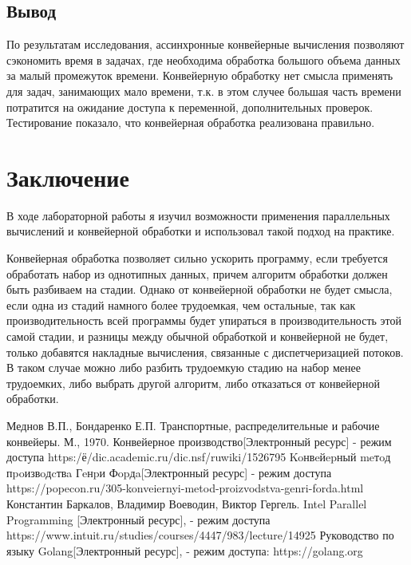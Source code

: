 \documentclass[12pt]{report}
\begin{document}
\section{Вывод}
По результатам исследования, ассинхронные конвейерные вычисления позволяют сэкономить время в задачах, где необходима обработка большого объема данных за малый промежуток времени. Конвейерную обработку нет смысла применять для задач, занимающих мало времени, т.к. в этом случее большая часть времени
потратится на ожидание доступа к переменной, дополнительных проверок.
Тестирование показало, что конвейерная обработка реализована правильно.

\chapter*{Заключение}
В ходе лабораторной работы я изучил возможности применения параллельных вычислений и конвейерной обработки и использовал такой подход на практике. 

Конвейерная обработка позволяет сильно ускорить программу, если требуется обработать набор из однотипных данных, причем алгоритм обработки должен быть разбиваем на стадии. Однако от конвейерной обработки не будет смысла, если одна из стадий намного более трудоемкая, чем остальные, так как производительность всей программы будет упираться в производительность этой самой стадии, и разницы между обычной обработкой и конвейерной не будет, только добавятся накладные вычисления, связанные с диспетчеризацией потоков. В таком случае можно либо разбить трудоемкую стадию на набор менее трудоемких, либо выбрать другой алгоритм, либо отказаться от конвейерной обработки.

 \begin{thebibliography}{3}
 Меднов В.П., Бондаренко Е.П. Транспортные, распределительные и рабочие конвейеры. М., 1970.
 Конвейерное производство[Электронный ресурс] - режим доступа https:/ё/dic.academic.ru/dic.nsf/ruwiki/1526795
 Koнвeйepный meтoд пpoизвoдcтвa Гeнpи Фopдa[Электронный ресурс] - режим доступа https://popecon.ru/305-konveiernyi-metod-proizvodstva-genri-forda.html
Константин Баркалов, Владимир Воеводин, Виктор Гергель. Intel Parallel Programming [Электронный ресурс], - режим доступа https://www.intuit.ru/studies/courses/4447/983/lecture/14925
Руководство по языку Golang[Электронный ресурс], - режим доступа: 
https://golang.org
\end{thebibliography}
\end{document}
